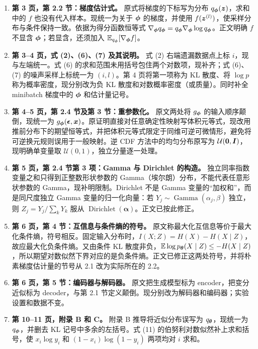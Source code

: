 \begin{enumerate}
\item \textbf{第 3 页，第 2.2 节：梯度估计式。}
原式将梯度的下标写为分布 $q_{\bm{\phi}}(\bm{z})$，求和中的 $f$ 也没有代入样本。现统一为关于 $\bm{\phi}$ 的梯度，并使用 $f(\bm{z}^{(l)})$，使采样分布与条件保持一致。依据为得分函数恒等式 $\nabla_{\bm{\phi}}q_{\bm{\phi}}=q_{\bm{\phi}}\nabla_{\bm{\phi}}\log q_{\bm{\phi}}$。正文明确 $f$ 不显含 $\bm{\phi}$；若显含，还须加入 $\mathbb{E}_{q_{\bm{\phi}}}[\nabla_{\bm{\phi}}f]$。

\item \textbf{第 3--4 页，式 (2)、(6)、(7) 及其说明。}
式 (2) 右端遗漏数据点上标 $i$，现与左端统一。式 (6) 的求和范围未用括号包住两个对数项，现补齐；式 (6)、(7) 的噪声采样上标统一为 $(i,l)$。第 4 页将第一项称为 KL 散度、将 $\log p$ 称为概率密度，现分别改为负 KL 散度和对数概率密度（或质量）。同时补全 minibatch 梯度中的 $\bm{\phi}$ 和估计量记号。

\item \textbf{第 4--5 页，第 2.4 节及第 3 节：重参数化。}
原文两处将 $g_{\bm{\phi}}$ 的输入顺序颠倒，现统一为 $g_{\bm{\phi}}(\bm{\epsilon},\bm{x})$。原证明直接对任意确定性映射写体积元等式，现改用推前分布下的期望恒等式，并把体积元等式限定于同维可逆可微情形，避免将可逆换元规则误用于一般映射。逆 CDF 方法中的均匀分布原写为 $\mathcal{U}(\bm{0},\bm{I})$，现明确单变量取 $\mathcal{U}(0,1)$，独立分量逐一处理。

\item \textbf{第 5 页，第 2.4 节第 3 项：Gamma 与 Dirichlet 的构造。}
独立同率指数变量之和只得到正整数形状参数的 Gamma（埃尔朗）分布，不能代表任意形状参数的 Gamma，现补明限制。Dirichlet 不是 Gamma 变量的“加权和”，而是同尺度独立 Gamma 变量的归一化向量：若 $Y_j\sim\operatorname{Gamma}(\alpha_j,\beta)$ 独立，则 $Z_j=Y_j/\sum_kY_k$ 服从 $\operatorname{Dirichlet}(\bm\alpha)$。正文已按此修正。

\item \textbf{第 6 页，第 4 节：互信息与条件熵的符号。}
原文称最大化互信息等价于最大化条件熵，符号相反。固定输入分布时，$I(X;Z)=H(X)-H(X\mid Z)$，故应最大化负条件熵。又由条件 KL 散度非负，$\mathbb{E}\log p_{\bm{\theta}}(X\mid Z)\leq-H(X\mid Z)$，所以期望对数似然下界对应的是负条件熵。正文已修正这两处符号，并将朴素梯度估计量的节号从 2.1 改为实际所在的 2.2。

\item \textbf{第 6 页，第 5 节：编码器与解码器。}
原文把生成模型标为 encoder，把变分近似标为 decoder，与第 2.1 节定义颠倒。现分别改为解码器和编码器；实验设置和数据不变。

\item \textbf{第 10--11 页，附录 B 和 C。}
附录 B 推导将近似分布误写为 $q_{\bm{\theta}}$，现统一为 $q_{\bm{\phi}}$，并删去 KL 记号中多余的左括号。式 (11) 的伯努利对数似然补上求和括号，使 $x_i\log y_i$ 和 $(1-x_i)\log(1-y_i)$ 两项均对 $i$ 求和。


\end{enumerate}
